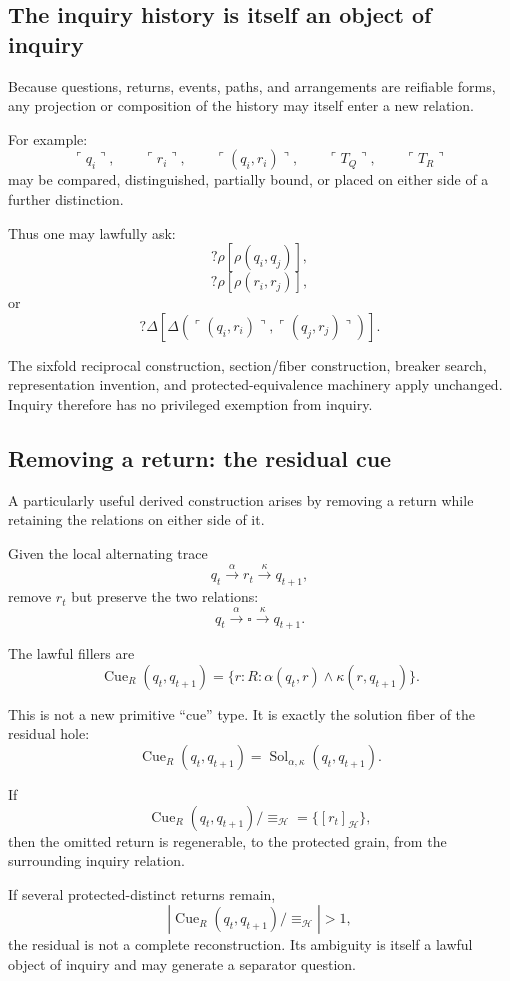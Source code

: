 \subsection{The inquiry history is itself an object of inquiry}

Because questions, returns, events, paths, and arrangements are reifiable
forms, any projection or composition of the history may itself enter a new
relation.

For example:
\[
\ulcorner q_i\urcorner,
\qquad
\ulcorner r_i\urcorner,
\qquad
\ulcorner(q_i,r_i)\urcorner,
\qquad
\ulcorner T_Q\urcorner,
\qquad
\ulcorner T_R\urcorner
\]
may be compared, distinguished, partially bound, or placed on either side of
a further distinction.

Thus one may lawfully ask:
\[
?\rho[\rho(q_i,q_j)],
\]
\[
?\rho[\rho(r_i,r_j)],
\]
or
\[
?\Delta[
\Delta(
\ulcorner(q_i,r_i)\urcorner,
\ulcorner(q_j,r_j)\urcorner)
].
\]

The sixfold reciprocal construction, section/fiber construction, breaker
search, representation invention, and protected-equivalence machinery apply
unchanged.  Inquiry therefore has no privileged exemption from inquiry.

\subsection{Removing a return: the residual cue}

A particularly useful derived construction arises by removing a return while
retaining the relations on either side of it.

Given the local alternating trace
\[
q_t\xrightarrow{\alpha}r_t\xrightarrow{\kappa}q_{t+1},
\]
remove \(r_t\) but preserve the two relations:
\[
q_t\xrightarrow{\alpha}\square\xrightarrow{\kappa}q_{t+1}.
\]

The lawful fillers are
\[
\boxed{
\operatorname{Cue}_R(q_t,q_{t+1})
=
\{
r:R:
\alpha(q_t,r)\land\kappa(r,q_{t+1})
\}.
}
\]

This is not a new primitive ``cue'' type.  It is exactly the solution fiber
of the residual hole:
\[
\operatorname{Cue}_R(q_t,q_{t+1})
=
\operatorname{Sol}_{\alpha,\kappa}(q_t,q_{t+1}).
\]

If
\[
\operatorname{Cue}_R(q_t,q_{t+1})/
{\equiv_{\mathcal H}}
=
\{[r_t]_{\mathcal H}\},
\]
then the omitted return is regenerable, to the protected grain, from the
surrounding inquiry relation.

If several protected-distinct returns remain,
\[
\left|
\operatorname{Cue}_R(q_t,q_{t+1})/
{\equiv_{\mathcal H}}
\right|>1,
\]
the residual is not a complete reconstruction.  Its ambiguity is itself a
lawful object of inquiry and may generate a separator question.


